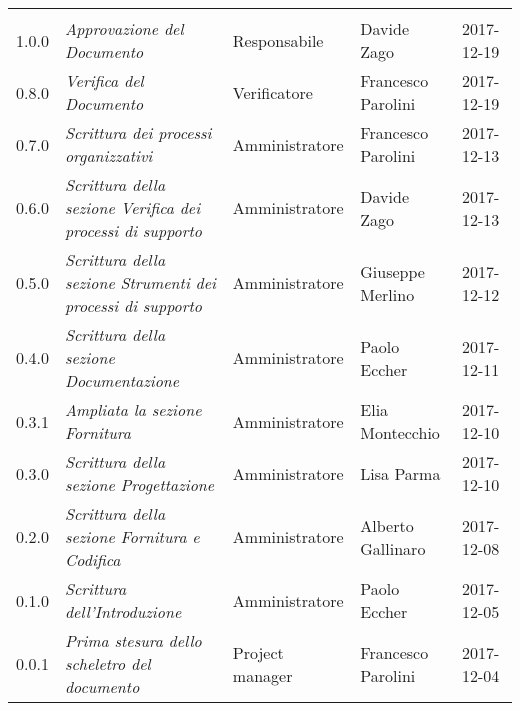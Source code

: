 \newpage 
\section*{}
\begin{table}[H]
	\centering
	\begin{tabular}{p{2cm}|C{4cm}|C{3cm}|R{3cm}|R{2cm}}

		
		
		 &  & &  & \\
		
		
		1.0.0  & \emph{Approvazione del Documento} & Responsabile & Davide Zago &  2017-12-19 \\
		\hline
		
		0.8.0  &  \emph{Verifica del Documento} & Verificatore & Francesco Parolini & 2017-12-19 \\
		\hline
		
		0.7.0  & \emph{Scrittura dei processi organizzativi}  & Amministratore & Francesco Parolini & 2017-12-13\\
		\hline
		
		0.6.0  & \emph{Scrittura della sezione Verifica dei processi di supporto} &  Amministratore & Davide Zago  & 2017-12-13 \\
		\hline
		
		0.5.0  & \emph{Scrittura della sezione Strumenti dei processi di supporto} & Amministratore & Giuseppe Merlino & 2017-12-12\\
		\hline
		
	   	0.4.0  &\emph{Scrittura della sezione Documentazione}& Amministratore & Paolo Eccher  & 2017-12-11 \\
		\hline
		
		 0.3.1 & \emph{Ampliata la sezione Fornitura}& Amministratore & Elia Montecchio & 2017-12-10 \\
		\hline
		
		0.3.0 & \emph{Scrittura della sezione Progettazione} & Amministratore & Lisa Parma & 2017-12-10 \\
		\hline
					
		0.2.0 & \emph{Scrittura della sezione Fornitura e Codifica} & Amministratore & Alberto Gallinaro & 2017-12-08 \\
		\hline
		
		0.1.0 & \emph{Scrittura dell'Introduzione} & Amministratore & Paolo Eccher & 2017-12-05 \\
		\hline
		
		0.0.1 &\emph{Prima stesura dello scheletro del documento} &  Project manager & Francesco Parolini & 2017-12-04 \\
	

	\end{tabular}
	
\end{table}


\clearpage
